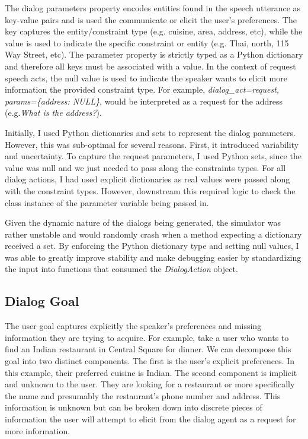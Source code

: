 The dialog parameters property encodes entities found in the speech utterance as key-value pairs and is used the communicate or elicit the user's preferences. The key captures the entity/constraint type (e.g. cuisine, area, address, etc), while the value is used to indicate the specific constraint or entity (e.g. Thai, north, 115 Way Street, etc). The parameter property is strictly typed as a Python dictionary and therefore all keys must be associated with a value. In the context of request speech acts, the null value is used to indicate the speaker wants to elicit more information the provided constraint type. For example, \textit{dialog\_act=request, params=\{address: NULL\}}, would be interpreted as a request for the address (e.g.\textit{What is the address?}). 

Initially, I used Python dictionaries and sets to represent the dialog parameters. However, this was sub-optimal for several reasons. First, it introduced variability and uncertainty. To capture the request parameters, I used Python sets, since the value was null and we just needed to pass along the constraints types. For all dialog actions, I had used explicit dictionaries as real values were passed along with the constraint types. However, downstream this required logic to check the class instance of the parameter variable being passed in. 

Given the dynamic nature of the dialogs being generated, the simulator was rather unstable and would randomly crash when a method expecting a dictionary received a set. By enforcing the Python dictionary type and setting null values, I was able to greatly improve stability and make debugging easier by standardizing the input into functions that consumed the \textit{DialogAction} object. 
\clearpage

\subsection{Dialog Goal}
\label{sec:dialog_goal}

The user goal captures explicitly the speaker's preferences and missing information they are trying to acquire. For example, take a user who wants to find an Indian restaurant in Central Square for dinner. We can decompose this goal into two distinct components. The first is the user's explicit preferences. In this example, their preferred cuisine is Indian. The second component is implicit and unknown to the user. They are looking for a restaurant or more specifically the name and presumably the restaurant's phone number and address. This information is unknown but can be broken down into discrete pieces of information the user will attempt to elicit from the dialog agent as a request for more information. 

